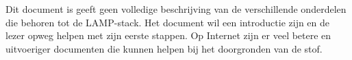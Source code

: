 Dit document is geeft geen volledige beschrijving van de verschillende onderdelen die behoren tot de LAMP-stack. Het document wil een introductie zijn en de lezer opweg helpen met zijn eerste stappen. Op Internet zijn er veel betere en uitvoeriger documenten die kunnen helpen bij het doorgronden van de stof.


